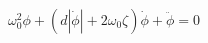 \begin{equation}
\omega_{0}^{2} \phi + \left(d \left|{\dot{\phi}}\right| + 2 \omega_{0} \zeta\right) \dot{\phi} + \ddot{\phi} = 0
\end{equation}
